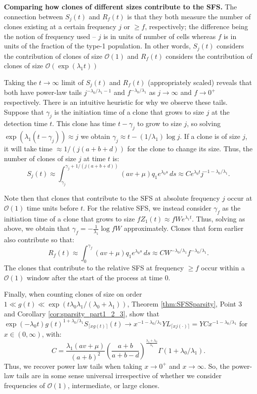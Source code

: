 \documentclass{article}
\numberwithin{equation}{section}
\begin{document}
\textbf{Comparing how clones of different sizes contribute to the SFS.} The connection between $S_j(t)$ and $R_f(t)$ is that they both measure the number of clones existing at a certain frequency $j$ or $\geq f$, respectively; the difference being the notion of frequency used -- $j$ is in units of number of cells whereas $f$ is in units of the fraction of the type-1 population. In other words, $S_j(t)$ considers the contribution of clones of size $\mathcal{O}(1)$ and $R_f(t)$ considers the contribution of clones of size $\mathcal{O}(\exp(\lambda_1 t))$ 

Taking the $t\to\infty$ limit of $S_j(t)$ and $R_f(t)$ (appropriately scaled) reveals that both have power-law tails $j^{-\lambda_0/\lambda_1-1}$ and $f^{-\lambda_0/\lambda_1}$ as $j\to\infty$ and $f\to0^+$ respectively. There is an intuitive heuristic for why we observe these tails. Suppose that $\gamma_j$ is the initiation time of a clone that grows to size $j$ at the detection time $t$. This clone has time $t-\gamma_j$ to grow to size $j$, so solving $\exp(\lambda_1 (t-\gamma_j))\approx j$ we obtain $\gamma_j\approx t-(1/\lambda_1)\log j$. If a clone is of size $j$, it will take time $\approx 1/(j(a+b+d))$ for the clone to change its size. Thus, the number of clones of size $j$ at time $t$ is:
\[S_j(t)\approx \int_{\gamma_j}^{\gamma_j+1/(j(a+b+d))}(av+\mu)q_1e^{\lambda_0 s}\,ds\approx Ce^{\lambda_0 t}j^{-1-\lambda_0/\lambda_1}.\]

Note then that clones that contribute to the SFS at absolute frequency $j$ occur at $\mathcal{O}(1)$ time units before $t$. For the relative SFS, we instead consider $\gamma_f$ as the initiation time of a clone that grows to size $ fZ_1(t)\approx fWe^{\lambda_1 t}$. Thus, solving as above, we obtain that $\gamma_f= -\frac{1}{\lambda_1}\log fW$ approximately. Clones that form earlier also contribute so that:
\[R_f(t)\approx \int_{0}^{\gamma_f}(av+\mu)q_1 e^{\lambda_0 s}\,ds\approx CW^{-\lambda_0/\lambda_1}f^{-\lambda_0/\lambda_1}.\]
The clones that contribute to the relative SFS at frequency $\geq f$ occur within a $\mathcal{O}(1)$ window after the start of the process at time $0$.

Finally, when counting clones of size on order $1\ll g(t)\ll \exp(t\lambda_0\lambda_1/(\lambda_0+\lambda_1))$, Theorem \ref{thm:SFSSparsity}, Point 3 and Corollary \ref{cor:sparsity_part1_2_3}, show that $\exp(-\lambda_0t)g(t)^{1+\lambda_0/\lambda_1}S_{\lceil xg(t)\rceil}(t)\to x^{-1-\lambda_0/\lambda_1}YL_{\lceil xj(\cdot)\rceil}=YCx^{-1-\lambda_0/\lambda_1}$ for $x\in (0,\infty)$, with:
\[C=\frac{\lambda_1(av+\mu)}{(a+b)^2}\left(\frac{a+b}{a+b-d}\right)^{\frac{\lambda_1+\lambda_0}{\lambda_1}}\Gamma(1+\lambda_0/\lambda_1).\]
Thus, we recover power law tails when taking $x\to0^+$ and $x\to\infty$. So, the power-law tails are in some sense universal irrespective of whether we consider frequencies of $\mathcal{O}(1)$, intermediate, or large clones.
\end{document}
